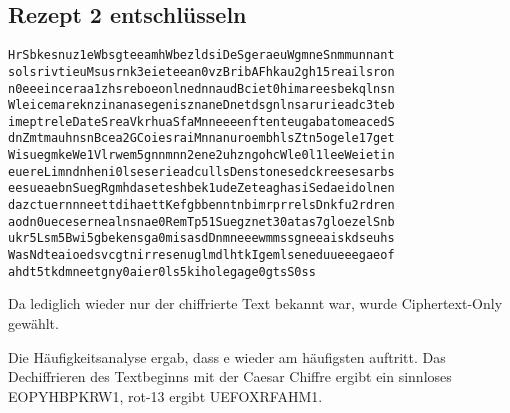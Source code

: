 \subsection{Rezept 2 entschlüsseln}
\label{RezeptZweiEntschluesseln}

{\tiny
\begin{lstlisting}[caption={Das verschlüsselte 2. Rezept: Rezept2NR.txt},
 linewidth=\textwidth,
 breaklines, breakatwhitespace=false]
HrSbkesnuz1eWbsgteeamhWbezldsiDeSgeraeuWgmneSnmmunnant
solsrivtieuMsusrnk3eieteean0vzBribAFhkau2gh15reailsron
n0eeeinceraa1zhsreboeonlnednnaudBciet0himareesbekqlnsn
WleicemareknzinanasegenisznaneDnetdsgnlnsarurieadc3teb
imeptreleDateSreaVkrhuaSfaMnneeeenftenteugabatomeacedS
dnZmtmauhnsnBcea2GCoiesraiMnnanuroembhlsZtn5ogele17get
WisuegmkeWe1Vlrwem5gnnmnn2ene2uhzngohcWle0l1leeWeietin
euereLimndnheni0lseserieadcullsDenstonesedckreesesarbs
eesueaebnSuegRgmhdaseteshbek1udeZeteaghasiSedaeidolnen
dazctuernnneettdihaettKefgbbenntnbimrprrelsDnkfu2rdren
aodn0uecesernealnsnae0RemTp51Suegznet30atas7gloezelSnb
ukr5Lsm5Bwi5gbekensga0misasdDnmneeewmmssgneeaiskdseuhs
WasNdteaioedsvcgtnirresenuglmdlhtkIgemlseneduueeegaeof
ahdt5tkdmneetgny0aier0ls5kiholegage0gtsS0ss
\end{lstlisting}
}

Da lediglich wieder nur der chiffrierte Text bekannt war, wurde Ciphertext-Only
gewählt.

Die Häufigkeitsanalyse ergab, dass \glqq{}e\grqq{} wieder am häufigsten auftritt. Das
Dechiffrieren des Textbeginns mit der Caesar Chiffre ergibt ein sinnloses
\glqq{}EOPYHBPKRW1\grqq{}, rot-13 ergibt \glqq{}UEFOXRFAHM1\grqq{}.

